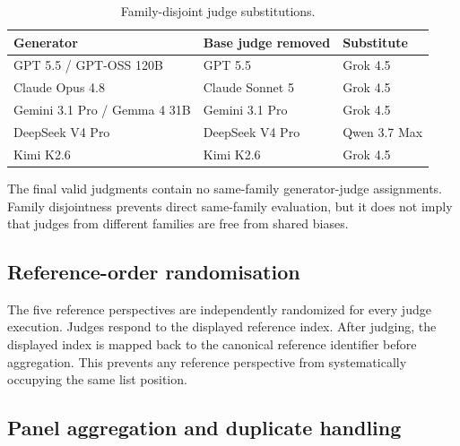 \documentclass[11pt,a4paper]{article}
\begin{document}
\begin{table}[htbp]
\centering
\caption{Family-disjoint judge substitutions.}
\label{tab:judge_substitutions}
\small
\begin{tabularx}{\columnwidth}{@{}Yp{0.25\columnwidth}p{0.20\columnwidth}@{}}
\toprule
Generator & Base judge removed & Substitute \\
\midrule
GPT 5.5 / GPT-OSS 120B & GPT 5.5 & Grok 4.5 \\
Claude Opus 4.8 & Claude Sonnet 5 & Grok 4.5 \\
Gemini 3.1 Pro / Gemma 4 31B & Gemini 3.1 Pro & Grok 4.5 \\
DeepSeek V4 Pro & DeepSeek V4 Pro & Qwen 3.7 Max \\
Kimi K2.6 & Kimi K2.6 & Grok 4.5 \\
\bottomrule
\end{tabularx}
\end{table}

The final valid judgments contain no same-family generator-judge assignments. Family disjointness prevents direct same-family evaluation, but it does not imply that judges from different families are free from shared biases.

\subsection{Reference-order randomisation}
\label{app:reference_randomization}

The five reference perspectives are independently randomized for every judge execution. Judges respond to the displayed reference index. After judging, the displayed index is mapped back to the canonical reference identifier before aggregation. This prevents any reference perspective from systematically occupying the same list position.

\subsection{Panel aggregation and duplicate handling}
\label{app:recall_aggregation}
\end{document}
